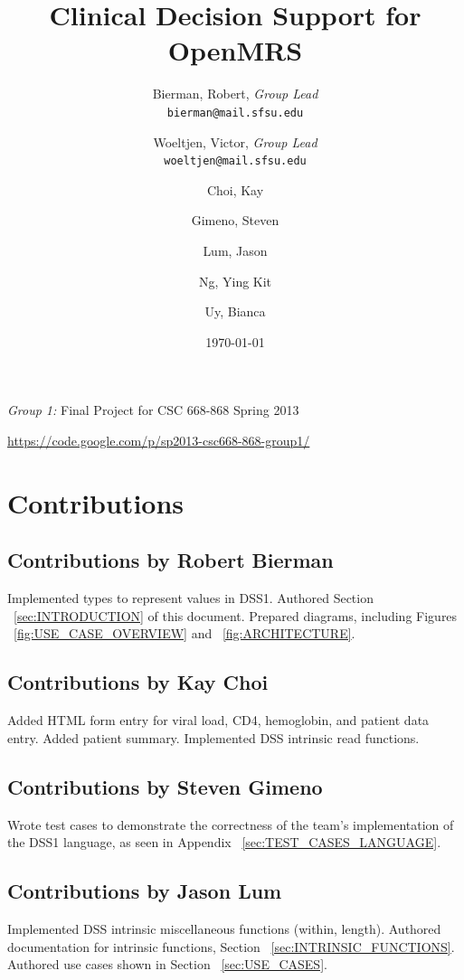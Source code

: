 \documentclass[12pt,letterpaper]{article}
\title{
  Clinical Decision Support for OpenMRS
}
\author{
        Bierman, Robert,  \emph{Group Lead}  \\ \texttt{bierman@mail.sfsu.edu} \and 
        Woeltjen, Victor, \emph{Group Lead}  \\ \texttt{woeltjen@mail.sfsu.edu} \and
        Choi, Kay       \and
        Gimeno, Steven  \and
        Lum, Jason      \and
        Ng, Ying Kit    \and
        Uy, Bianca      
}
\date{\today}
\begin{document}
\setcounter{tocdepth}{2}

\newpage 

\maketitle
\begin{center}
\begin{Large}\emph{Group 1:} Final Project for CSC 668-868 Spring 2013\end{Large} \linebreak
\url{https://code.google.com/p/sp2013-csc668-868-group1/}
\end{center}
\thispagestyle{empty} %

\newpage {}
\tableofcontents


\newpage {}
\section{Contributions} 

\subsection{Contributions by Robert Bierman}
Implemented types to represent values in DSS1. Authored Section 
~\ref{sec:INTRODUCTION} of this document. Prepared diagrams, including 
Figures ~\ref{fig:USE_CASE_OVERVIEW} and ~\ref{fig:ARCHITECTURE}.

\subsection{Contributions by Kay Choi}
Added HTML form entry for viral load, CD4, hemoglobin, and 
patient data entry. Added patient summary. Implemented DSS intrinsic read 
functions.

\subsection{Contributions by Steven Gimeno}
Wrote test cases to demonstrate the correctness of the team's implementation 
of the DSS1 language, as seen in Appendix ~\ref{sec:TEST_CASES_LANGUAGE}.

\subsection{Contributions by Jason Lum}
Implemented DSS intrinsic miscellaneous functions (within, length). 
Authored documentation for intrinsic functions, Section ~\ref{sec:INTRINSIC_FUNCTIONS}. Authored use cases shown in Section ~\ref{sec:USE_CASES}.
\end{document}
